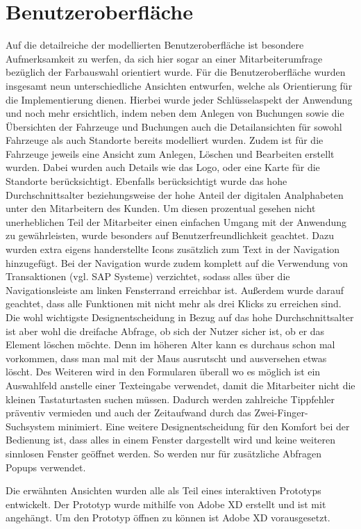 \section{Benutzeroberfläche}
Auf die detailreiche der modellierten Benutzeroberfläche ist besondere Aufmerksamkeit zu werfen, da sich hier sogar an einer Mitarbeiterumfrage bezüglich der Farbauswahl orientiert wurde. Für die Benutzeroberfläche wurden insgesamt neun unterschiedliche Ansichten entwurfen, welche als Orientierung für die Implementierung dienen. Hierbei wurde jeder Schlüsselaspekt der Anwendung und noch mehr ersichtlich, indem neben dem Anlegen von Buchungen sowie die Übersichten der Fahrzeuge und Buchungen auch die Detailansichten für sowohl Fahrzeuge als auch Standorte bereits modelliert wurden. Zudem ist für die Fahrzeuge jeweils eine Ansicht zum Anlegen, Löschen und Bearbeiten erstellt wurden. Dabei wurden auch Details wie das Logo, oder eine Karte für die Standorte berücksichtigt. Ebenfalls berücksichtigt wurde das hohe Durchschnittsalter beziehungsweise der hohe Anteil der digitalen Analphabeten unter den Mitarbeitern des Kunden. Um diesen prozentual gesehen nicht unerheblichen Teil der Mitarbeiter einen einfachen Umgang mit der Anwendung zu gewährleisten, wurde besonders auf Benutzerfreundlichkeit geachtet. Dazu wurden extra eigens handerstellte Icons zusätzlich zum Text in der Navigation hinzugefügt. Bei der Navigation wurde zudem komplett auf die Verwendung von Transaktionen (vgl. SAP Systeme) verzichtet, sodass alles über die Navigationsleiste am linken Fensterrand erreichbar ist. Außerdem wurde darauf geachtet, dass alle Funktionen mit nicht mehr als drei Klicks zu erreichen sind. Die wohl wichtigste Designentscheidung in Bezug auf das hohe Durchschnittsalter ist aber wohl die dreifache Abfrage, ob sich der Nutzer sicher ist, ob er das Element löschen möchte. Denn im höheren Alter kann es durchaus schon mal vorkommen, dass man mal mit der Maus ausrutscht und ausversehen etwas löscht. Des Weiteren wird in den Formularen überall wo es möglich ist ein Auswahlfeld anstelle einer Texteingabe verwendet, damit die Mitarbeiter nicht die kleinen Tastaturtasten suchen müssen. Dadurch werden zahlreiche Tippfehler präventiv vermieden und auch der Zeitaufwand durch das Zwei-Finger-Suchsystem minimiert. Eine weitere Designentscheidung für den Komfort bei der Bedienung ist, dass alles in einem Fenster dargestellt wird und keine weiteren sinnlosen Fenster geöffnet werden. So werden nur für zusätzliche Abfragen Popups verwendet.

Die erwähnten Ansichten wurden alle als Teil eines interaktiven Prototyps entwickelt. Der Prototyp wurde mithilfe von Adobe XD erstellt und ist mit angehängt. Um den Prototyp öffnen zu können ist Adobe XD vorausgesetzt.

